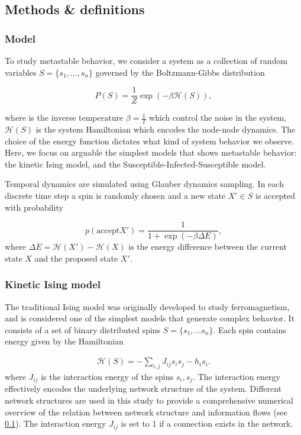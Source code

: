 \documentclass[a4paper, 11pt, twocolumn]{article}
\begin{document}
\subsection{Methods \& definitions}
\label{sec:org8193119}
\subsubsection{Model}
\label{sec:org5382bb5}
To  study metastable  behavior, we  consider a  system as  a
collection of random variables $S = \{s_1, \dots, s_n\}$ governed
by the Boltzmann-Gibbs distribution

\begin{equation}
P(S)    =     \frac{1}{Z}    \exp(- \beta \mathcal{H}(S) ),
\end{equation}

where  is the  inverse temperature  $\beta =  \frac{1}{T}$ which
control  the  noise in  the  system,  $\mathcal{H}(S)$ is  the  system
Hamiltonian which encodes the node-node dynamics. The choice
of the energy function dictates what kind of system behavior
we observe. Here, we focus on arguable the simplest models that
shows metastable behavior: the  kinetic Ising model, and the
Susceptible-Infected-Susceptible model.

Temporal  dynamics  are simulated  using Glauber dynamics
sampling.  In each  discrete time  step a  spin is  randomly
chosen and a new state $X'\in S$ is accepted with probability

\begin{equation}
\label{eq:glauber}
p( \text{accept} X' ) = \frac{1}{1 + \exp(-\beta \Delta E)},
\end{equation}
where $\Delta E = \mathcal{H}(X') -  \mathcal{H}(X)$ is the energy difference between
the current state $X$ and the proposed state $X'$.


\subsubsection{Kinetic Ising model}
\label{sec:orgb324012}
The  traditional Ising  model  was  originally developed  to
study ferromagnetism, and is  considered one of the simplest
models that generate complex behavior.  It consists of a set
of binary distributed  spins $S = \{s_1,  \dots s_n\}$. Each
spin contains energy given by the Hamiltonian

\begin{equation}
\label{eq:energy}
\begin{split}
    \mathcal{H}(S) = -\sum_{i,j} J_{ij} s_{i} s_{j} - h_{i} s_{i}.
\end{split}
\end{equation}
where $J_{ij}$ is the interaction  energy of the spins $s_i,
s_j$.  The   interaction  energy  effectively   encodes  the
underlying  network  structure   of  the  system.  Different
network  structures are  used  in this  study  to provide  a
comprehensive  numerical overview  of  the relation  between
network  structure and  information flows  (see \ref{sec:org8193119}). The interaction energy  $J_{ij}$ is set to 1
if a connection exists in the network.
\end{document}
